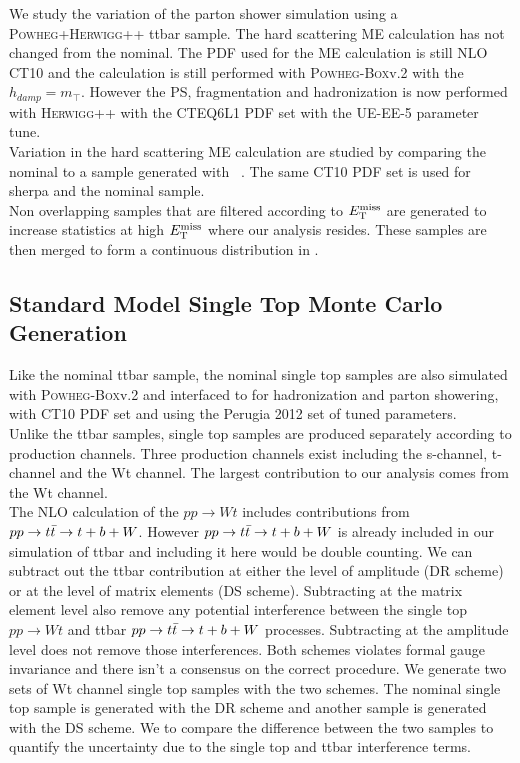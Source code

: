 \indent We study the variation of the parton shower simulation using a \textsc{Powheg+Herwigg++} ttbar sample.  The hard scattering ME calculation has not changed from the nominal.  The PDF used for the ME calculation is still NLO CT10 and the calculation is still performed with \textsc{Powheg-Box}v.2 with the $h_{damp} = m_{\top}$.  However the PS, fragmentation and hadronization is now performed with \textsc{Herwigg++} with the CTEQ6L1 PDF set \cite{CTEQ6L1} with the UE-EE-5 parameter tune. \\

\indent Variation in the hard scattering ME calculation are studied by comparing the nominal to a sample generated with \sherpa~\cite{sherpa}.  The same CT10 PDF set is used for sherpa and the nominal sample. \\ 

\indent Non overlapping samples that are filtered according to $E_{\mathrm{T}}^{\mathrm{miss}}$ are generated to increase statistics at high $E_{\mathrm{T}}^{\mathrm{miss}}$ where our analysis resides.  These samples are then merged to form a  continuous distribution in \MET. \\

\subsection{Standard Model Single Top Monte Carlo Generation}

\indent Like the nominal ttbar sample, the nominal single top samples are also simulated with \textsc{Powheg-Box}v.2 and interfaced to  for hadronization and parton showering, with CT10 PDF set and using the Perugia 2012 set \cite{Perugia2012} of tuned parameters. \\

\indent Unlike the ttbar samples, single top samples are produced separately according to production channels.  Three production channels exist including the s-channel, t-channel and the Wt channel.  The largest contribution to our analysis comes from the Wt channel.  \\

\indent The NLO calculation of the $pp \rightarrow Wt$ includes contributions from $ pp \rightarrow t\bar{t} \rightarrow t + b + W$.  However $ pp \rightarrow t\bar{t} \rightarrow t + b + W$ is already included in our simulation of ttbar and including it here would be double counting.  We can subtract out the ttbar contribution at either the level of amplitude (DR scheme) or at the level of matrix elements (DS scheme).  Subtracting at the matrix element level also remove any potential interference between the single top $pp \rightarrow Wt$ and ttbar $ pp \rightarrow t\bar{t} \rightarrow t + b + W$ processes.  Subtracting at the amplitude level does not remove those interferences.  Both schemes violates formal gauge invariance and there isn't a consensus on the correct procedure.  We generate two sets of Wt channel single top samples with the two schemes.  The nominal single top sample is generated with the DR scheme and another sample is generated with the DS scheme.  We to compare the difference between the two samples to quantify the uncertainty due to the single top and ttbar interference terms. \\

